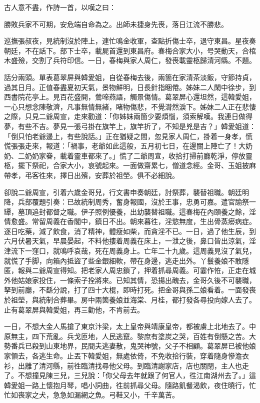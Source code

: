 古人意不盡，作詩一首，以嘆之曰：

勝敗兵家不可期，安危端自命為之。出師未捷身先䘮，落日江流不勝悲。

巡撫張叔夜，見統制沒於陣上，連忙鳴金收軍，查點折傷士卒，退守東昌。星夜奏朝廷，不在話下。部下士卒，載屍首還到東昌府。春梅合家大小，号哭動天，合棺木盛殮，交割了兵符印信。一日，春梅與家人周仁，發䘮載靈柩歸清河縣。不題。

話分兩頭。單表葛翠屏與韓愛姐，自從春梅去後，兩箇在家清茶淡飯，守節持貞，過其日月。正值春盡夏初天氣，景物鮮明，日長針指睏倦。姊妹二人閑中徐步，到西書院花亭上。見百花盛開，鶯啼燕語，觸景傷情。葛翠屏心還坦然，這韓愛姐，一心只想念陳敬濟，凡事無情無緒，睹物傷悲，不覺潸然淚下。{}姊妹二人正在悲悽之際，只見二爺周宣，走來勸道：「你姊妹兩箇少要煩惱，須索解嘆。我連日做得夢，有些不吉。夢見一張弓掛在旗竿上，旗竿折了，不知是兇是吉？」韓愛姐道：「倒只怕老爺邊上，有些說話。」正在猶疑之間，忽見家人周仁，掛着一身孝，慌慌張張走來，報道：「禍事，老爺如此這般，五月初七日，在邊關上陣亡了！大奶奶、二奶奶家眷，載着靈車都來了。」慌了二爺周宣，收拾打掃前廳乾淨，停放靈柩，擺下祭祀，合家大小，哀號起來。一面做齋累七，僧道念經。金哥、玉姐披麻帶孝，弔客徃來，擇日出殯，安葬於祖塋。俱不必細說。

卻說二爺周宣，引着六歲金哥兒，行文書申奏朝廷，討祭葬，襲替祖職。朝廷明降，兵部覆題引奏：已故統制周秀，奮身報國，沒於王事，忠勇可嘉。遣官諭祭一罈，墓頂追封都督之職。伊子照例優養，出幼襲替祖職。這春梅在內頤養之餘，淫情愈盛。常留周義在香閣中，鎮日不出。朝來暮徃，淫慾無度，生出骨蒸癆病症。逐日吃藥，減了飲食，消了精神，體瘦如柴，而貪淫不已。一日，過了他生辰，到六月伏暑天氣，早晨晏起，不料他摟着周義在床上，一泄之後，{}鼻口皆出涼氣，淫津流下一窪口，就鳴呼哀哉，死在周義身上。亡年二十九歲。{}這周義見沒了氣兒，就慌了手脚，向箱內抵盜了些金銀細軟，帶在身邊，逃走出外。丫鬟養娘不敢隱匿，報與二爺周宣得知。把老家人周忠鎖了，押着抓尋周義。可霎作恠，正走在城外他姑娘家投住，一條索子拴將來。已知其情，恐揚出醜去，金哥久後不可襲職，拏到前廳，不繇分說，打了四十大棍，即時打死。{}把金哥與孫二娘看着。一面發䘮於祖塋，與統制合葬畢。房中兩箇養娘並海棠、月桂，都打發各尋投向嫁人去了。止有葛翠屏與韓愛姐，再三勸他，不肯前去。

一日，不想大金人馬搶了東京汴梁，太上皇帝與靖康皇帝，都被虜上北地去了。中原無主，四下荒亂。兵戈匝地，人民逃竄。黎庶有塗炭之哭，百姓有倒懸之苦。大勢番兵已殺到山東地界，民間夫逃妻散，鬼哭神號，父子不相顧。葛翠屏已被他娘家領去，各逃生命。止丟下韓愛姐，無處依倚，不免收拾行裝，穿着隨身慘澹衣衫，出離了清河縣，前徃臨清找尋他父母。到臨清謝家店，店也關閉，主人也走了。不想撞見陳三兒，三兒說：「你父母去年就跟了何官人，徃江南湖州去了。」這韓愛姐一路上懷抱月琴，唱小詞曲，徃前抓尋父母。隨路飢餐渴飲，夜住曉行，忙忙如䘮家之犬，急急如漏網之魚。弓鞋又小，千辛萬苦。

